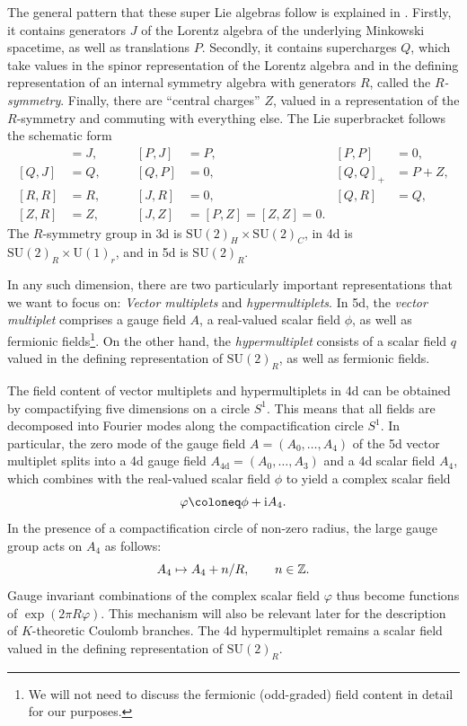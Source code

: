 The general pattern that these super Lie algebras follow is explained in \cite{strathdee_extended_1987}. Firstly, it contains generators $J$ of the Lorentz algebra of the underlying Minkowski spacetime, as well as translations $P$. Secondly, it contains supercharges $Q$, which take values in the spinor representation of the Lorentz algebra and in the defining representation of an internal symmetry algebra with generators $R$, called the \emph{$R$-symmetry}. Finally, there are ``central charges'' $Z$, valued in a representation of the $R$-symmetry and commuting with everything else. The Lie superbracket follows the schematic form
\begin{align}
	[J,J] &= J, \qquad &[P,J] &= P, \qquad &[P,P] &= 0, \\
	[Q,J] &= Q, \qquad &[Q,P] &= 0, \qquad &[Q,Q]_+ &= P+Z, \\
	[R,R] &= R, \qquad &[J,R] &= 0, \qquad &[Q,R] &= Q, \\
	[Z,R] &= Z, \qquad &[J,Z] &= [P,Z] = [Z,Z] = 0.
\end{align}
The $R$-symmetry group in 3d is $\mathrm{SU}(2)_H \times \mathrm{SU}(2)_C$, in 4d is $\mathrm{SU}(2)_R \times \mathrm{U}(1)_r$, and in 5d is $\mathrm{SU}(2)_R$.

In any such dimension, there are two particularly important representations that we want to focus on: \emph{Vector multiplets} and \emph{hypermultiplets}. In 5d, the \emph{vector multiplet} comprises a gauge field $A$, a real-valued scalar field $\phi$, as well as fermionic fields\footnote{We will not need to discuss the fermionic (odd-graded) field content in detail for our purposes.}. On the other hand, the \emph{hypermultiplet} consists of a scalar field $q$ valued in the defining representation of $\mathrm{SU}(2)_R$, as well as fermionic fields.

The field content of vector multiplets and hypermultiplets in 4d can be obtained by compactifying five dimensions on a circle $S^1$. This means that all fields are decomposed into Fourier modes along the compactification circle $S^1$. In particular, the zero mode of the gauge field $A = (A_0,\dots,A_4)$ of the 5d vector multiplet splits into a 4d gauge field $A_\text{4d} = (A_0,\dots,A_3)$ and a 4d scalar field $A_4$, which combines with the real-valued scalar field $\phi$ to yield a complex scalar field
\begin{equation}
	\varphi \coloneq \phi + \I A_4.
\end{equation}
In the presence of a compactification circle of non-zero radius, the large gauge group acts on $A_4$ as follows:
\begin{equation}
	A_4 \mapsto A_4 + n/R, \qquad n \in \mathbb{Z}.
\end{equation}
Gauge invariant combinations of the complex scalar field $\varphi$ thus become functions of $\exp(2\pi R \varphi)$. This mechanism will also be relevant later for the description of $K$-theoretic Coulomb branches. The 4d hypermultiplet remains a scalar field valued in the defining representation of $\mathrm{SU}(2)_R$.

